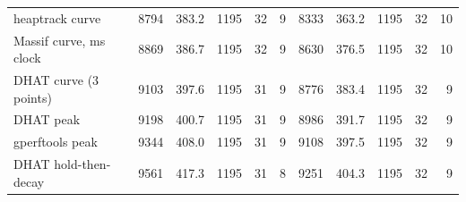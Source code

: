 \begin{tabular}{lrrrrrrrrrr}
heaptrack curve & 8794 & 383.2 & 1195 & 32 & 9 & 8333 & 363.2 & 1195 & 32 & 10 \\
Massif curve, ms clock & 8869 & 386.7 & 1195 & 32 & 9 & 8630 & 376.5 & 1195 & 32 & 10 \\
DHAT curve (3 points) & 9103 & 397.6 & 1195 & 31 & 9 & 8776 & 383.4 & 1195 & 32 & 9 \\
DHAT peak & 9198 & 400.7 & 1195 & 31 & 9 & 8986 & 391.7 & 1195 & 32 & 9 \\
gperftools peak & 9344 & 408.0 & 1195 & 31 & 9 & 9108 & 397.5 & 1195 & 32 & 9 \\
DHAT hold-then-decay & 9561 & 417.3 & 1195 & 31 & 8 & 9251 & 404.3 & 1195 & 32 & 9 \\
\bottomrule
\end{tabular}
